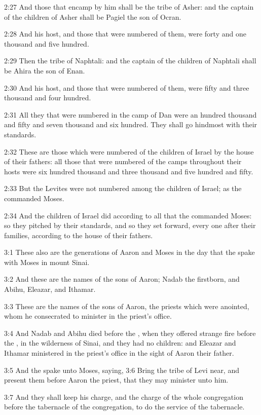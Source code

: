 2:27 And those that encamp by him shall be the tribe of Asher: and the captain of the children of Asher shall be Pagiel the son of Ocran.

2:28 And his host, and those that were numbered of them, were forty and one thousand and five hundred.

2:29 Then the tribe of Naphtali: and the captain of the children of Naphtali shall be Ahira the son of Enan.

2:30 And his host, and those that were numbered of them, were fifty and three thousand and four hundred.

2:31 All they that were numbered in the camp of Dan were an hundred thousand and fifty and seven thousand and six hundred. They shall go hindmost with their standards.

2:32 These are those which were numbered of the children of Israel by the house of their fathers: all those that were numbered of the camps throughout their hosts were six hundred thousand and three thousand and five hundred and fifty.

2:33 But the Levites were not numbered among the children of Israel; as the \LORD commanded Moses.

2:34 And the children of Israel did according to all that the \LORD commanded Moses: so they pitched by their standards, and so they set forward, every one after their families, according to the house of their fathers.

3:1 These also are the generations of Aaron and Moses in the day that the \LORD spake with Moses in mount Sinai.

3:2 And these are the names of the sons of Aaron; Nadab the firstborn, and Abihu, Eleazar, and Ithamar.

3:3 These are the names of the sons of Aaron, the priests which were anointed, whom he consecrated to minister in the priest's office.

3:4 And Nadab and Abihu died before the \LORD, when they offered strange fire before the \LORD, in the wilderness of Sinai, and they had no children: and Eleazar and Ithamar ministered in the priest's office in the sight of Aaron their father.

3:5 And the \LORD spake unto Moses, saying, 3:6 Bring the tribe of Levi near, and present them before Aaron the priest, that they may minister unto him.

3:7 And they shall keep his charge, and the charge of the whole congregation before the tabernacle of the congregation, to do the service of the tabernacle.

